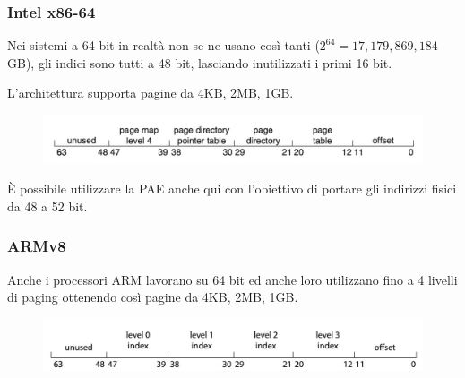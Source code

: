 \subsubsection{Intel x86-64}
Nei sistemi a 64 bit in realtà non se ne usano così tanti ($2^{64} = 17,179,869,184$ GB), gli indici sono tutti a 48 bit, lasciando inutilizzati i primi 16 bit.

L'architettura supporta pagine da 4KB, 2MB, 1GB.

\begin{figure}[H]
    \centering
    \includegraphics[width=0.6\linewidth]{assets/x64-address.jpg}
\end{figure}

È possibile utilizzare la PAE anche qui con l'obiettivo di portare gli indirizzi fisici da 48 a 52 bit.

\subsubsection{ARMv8}
Anche i processori ARM lavorano su 64 bit ed anche loro utilizzano fino a 4 livelli di paging ottenendo così pagine da 4KB, 2MB, 1GB.

\begin{figure}[H]
    \centering
    \includegraphics[width=0.6\linewidth]{assets/arm-address.jpg}
\end{figure}
